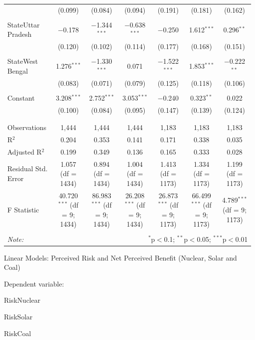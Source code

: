 \documentclass[
]{article}
\begin{document}
\begin{landscape}
\begin{table}[!htbp]
\begin{tabular}{@{\extracolsep{5pt}}lcccccc}
  & (0.099) & (0.084) & (0.094) & (0.191) & (0.181) & (0.162) \\ 
  & & & & & & \\ 
 StateUttar Pradesh & $-$0.178 & $-$1.344$^{***}$ & $-$0.638$^{***}$ & $-$0.250 & 1.612$^{***}$ & 0.296$^{**}$ \\ 
  & (0.120) & (0.102) & (0.114) & (0.177) & (0.168) & (0.151) \\ 
  & & & & & & \\ 
 StateWest Bengal & 1.276$^{***}$ & $-$1.330$^{***}$ & 0.071 & $-$1.522$^{***}$ & 1.853$^{***}$ & $-$0.222$^{**}$ \\ 
  & (0.083) & (0.071) & (0.079) & (0.125) & (0.118) & (0.106) \\ 
  & & & & & & \\ 
 Constant & 3.208$^{***}$ & 2.752$^{***}$ & 3.053$^{***}$ & $-$0.240 & 0.323$^{**}$ & 0.022 \\ 
  & (0.100) & (0.084) & (0.095) & (0.147) & (0.139) & (0.124) \\ 
  & & & & & & \\ 
\hline \\[-1.8ex] 
Observations & 1,444 & 1,444 & 1,444 & 1,183 & 1,183 & 1,183 \\ 
R$^{2}$ & 0.204 & 0.353 & 0.141 & 0.171 & 0.338 & 0.035 \\ 
Adjusted R$^{2}$ & 0.199 & 0.349 & 0.136 & 0.165 & 0.333 & 0.028 \\ 
Residual Std. Error & 1.057 (df = 1434) & 0.894 (df = 1434) & 1.004 (df = 1434) & 1.413 (df = 1173) & 1.334 (df = 1173) & 1.199 (df = 1173) \\ 
F Statistic & 40.720$^{***}$ (df = 9; 1434) & 86.983$^{***}$ (df = 9; 1434) & 26.208$^{***}$ (df = 9; 1434) & 26.873$^{***}$ (df = 9; 1173) & 66.499$^{***}$ (df = 9; 1173) & 4.789$^{***}$ (df = 9; 1173) \\ 
\hline 
\hline \\[-1.8ex] 
\textit{Note:}  & \multicolumn{6}{r}{$^{*}$p$<$0.1; $^{**}$p$<$0.05; $^{***}$p$<$0.01} \\ 
\end{tabular} 
\end{table} 
\endgroup

Linear Models: Perceived Risk and Net Perceived Benefit (Nuclear, Solar
and Coal)

Dependent variable:

RiskNuclear

RiskSolar

RiskCoal


\end{landscape}
\end{document}
